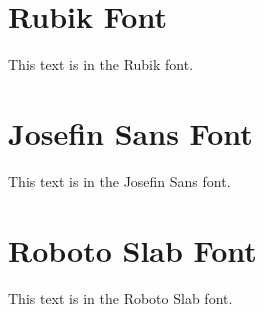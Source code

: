 \documentclass{article}
\begin{document}
\section{Rubik Font}
This text is in the Rubik font.

\section{Josefin Sans Font}
{\josefinsans This text is in the Josefin Sans font.}

\section{Roboto Slab Font}
{\robotoslab This text is in the Roboto Slab font.}
\end{document}
